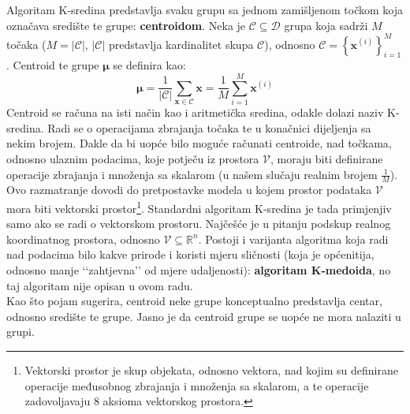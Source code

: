 \documentclass[times, utf8, zavrsni]{fer}
\begin{document}
Algoritam K-sredina predstavlja svaku grupu sa jednom zamišljenom točkom koja označava središte te grupe: \textbf{centroidom}. Neka je $\mathcal{C} \subseteq \mathcal{D}$ grupa koja sadrži $M$ točaka ($M = \vert \mathcal{C} \vert$, $\vert \mathcal{C} \vert$ predstavlja kardinalitet skupa $\mathcal{C}$), odnosno 
$\mathcal{C} = \left\{ \mathbf{x}^{(i)}  \right\}_{i=1}^{M}$.
Centroid te grupe $\boldsymbol{\mu}$ se definira kao:
\[\boldsymbol{\mu} = \frac{1}{\vert \mathcal{C} \vert} \sum_{\mathbf{x} \in \mathcal{C}} \mathbf{x} = 
\frac{1}{M} \sum_{i=1}^{M} \mathbf{x}^{(i)}\]
Centroid se računa na isti način kao i aritmetička sredina, odakle dolazi naziv K-sredina. Radi se o operacijama zbrajanja točaka te u konačnici dijeljenja sa nekim brojem. Dakle da bi uopće bilo moguće računati centroide, nad točkama, odnosno ulaznim podacima, koje potječu iz prostora $\mathcal{V}$, moraju biti definirane operacije zbrajanja i množenja sa skalarom (u našem slučaju realnim brojem $\frac{1}{M}$). Ovo razmatranje dovodi do pretpostavke modela u kojem prostor podataka $\mathcal{V}$ mora biti vektorski prostor\footnote{Vektorski prostor je skup objekata, odnosno vektora, nad kojim su definirane operacije međusobnog zbrajanja i množenja sa skalarom, a te operacije zadovoljavaju 8 aksioma vektorskog prostora.}. Standardni algoritam K-sredina je tada primjenjiv samo ako se radi o vektorskom prostoru. Najčešće je u pitanju podskup realnog koordinatnog prostora, odnosno $\mathcal{V} \subseteq \mathbb{R}^n$. 
Postoji i varijanta algoritma koja radi nad podacima bilo kakve prirode i koristi mjeru sličnosti (koja je općenitija, odnosno manje ‘‘zahtjevna’’ od mjere udaljenosti): \textbf{algoritam K-medoida}, no taj algoritam nije opisan u ovom radu.\\
Kao što pojam sugerira, centroid neke grupe konceptualno predstavlja centar, odnosno središte te grupe. Jasno je da centroid grupe se uopće ne mora nalaziti u grupi.
\end{document}
